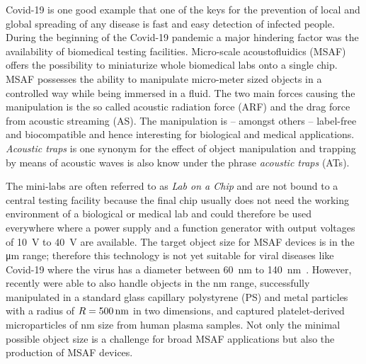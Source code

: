 Covid-19 is one good example that one of the keys for the prevention of local 
and global spreading of any disease is fast and easy detection of infected 
people. During the beginning of the Covid-19 pandemic a major hindering factor 
was the availability of biomedical testing facilities. Micro-scale 
acoustofluidics (MSAF) offers the possibility to miniaturize whole biomedical 
labs onto a single chip. MSAF possesses the ability to manipulate micro-meter 
sized objects in a controlled way while being immersed in a fluid. The two main 
forces causing the manipulation is the so called acoustic radiation force (ARF) 
and the drag force from acoustic streaming (AS). The manipulation is -- amongst 
others -- label-free and biocompatible and hence interesting for biological and 
medical applications. \emph{Acoustic traps} is one synonym for the effect of 
object manipulation and trapping by means of acoustic waves is also know under 
the phrase \emph{acoustic traps} (ATs).

The mini-labs are often referred to as \emph{Lab on a Chip} and are not bound 
to a central testing facility because the final chip usually does not need the 
working environment of a biological or medical lab and could therefore be used 
everywhere where a power supply and a function generator with output voltages 
of \SI{10}{\volt} to \SI{40}{\volt} are available. The target object size for 
MSAF devices is in the \si{\um} range; therefore this technology is not yet 
suitable for viral diseases like Covid-19 where the virus has a diameter 
between \SI{60}{\nm} to \SI{140}{\nm}~\cite{Bar-On2020}. However, recently 
 were able to also handle objects in the \si{\nano\meter} range, 
 successfully manipulated in a standard glass capillary 
polystyrene (PS) and metal particles with a radius of $\R=\SI{500}{\nm}$ in two 
dimensions, and  captured platelet-derived microparticles of 
\si{\nm} size from human plasma samples. Not only the minimal possible object 
size is a challenge for broad MSAF applications but also the production of MSAF 
devices.

